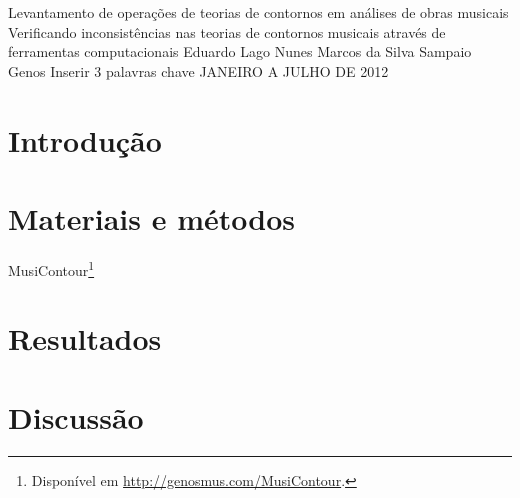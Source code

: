 \documentclass[11pt]{article}
\begin{document}
\graphicspath{{figs/}}


\dadosRelatorioFinal
{Levantamento de operações de teorias de contornos em análises de
  obras musicais}
{Verificando inconsistências nas teorias de contornos musicais através
  de ferramentas computacionais }
{Eduardo Lago Nunes}
{Marcos da Silva Sampaio}
{Genos}
{Inserir 3 palavras chave}
{JANEIRO A JULHO DE 2012}


\newpage

\setcounter{page}{1}
\onehalfspace

\section{Introdução}
\label{sec:introducao}


\section{Materiais e métodos}
\label{sec:materiais}

MusiContour\footnote{Disponível em \url{http://genosmus.com/MusiContour}.}

\section{Resultados}
\label{sec:resultados}

\section{Discussão}
\label{sec:discussao}
\end{document}
